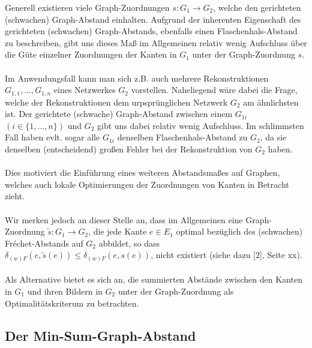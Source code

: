 \documentclass[a4paper, 12pt, twoside]{article}
\theoremstyle{Format1} %
\begin{document}
Generell existieren viele Graph-Zuordnungen $s: G_1 \to G_2$, welche den gerichteten (schwachen) Graph-Abstand einhalten.
Aufgrund der inherenten Eigenschaft des gerichteten (schwachen) Graph-Abstands, ebenfalls einen Flaschenhals-Abstand zu beschreiben, gibt uns dieses Maß im
Allgemeinen relativ wenig Aufschluss über die Güte einzelner Zuordnungen der Kanten in $G_1$ unter der Graph-Zuordnung $s$.
\\
\\
Im Anwendungsfall kann man sich z.B. auch mehrere Rekonstruktionen $G_{1,1}, ..., G_{1,n}$ eines Netzwerkes $G_2$ vorstellen.
Naheliegend wäre dabei die Frage, welche der Rekonstruktionen dem urpsprünglichen Netzwerk $G_2$ am ähnlichsten ist.
Der gerichtete (schwache) Graph-Abstand zwischen einem $G_{1i}$ $(i \in \{1,...,n\})$ und $G_2$ gibt uns dabei relativ wenig Aufschluss.
Im schlimmsten Fall haben evlt. sogar alle $G_{1i}$ denselben Flaschenhals-Abstand zu $G_2$, da sie denselben (entscheidend) großen Fehler bei der Rekonstruktion von $G_2$ haben.
\\
\\
Dies motiviert die Einführung eines weiteren Abstandsmaßes auf Graphen, welches auch lokale Optimierungen der Zuordnungen von Kanten in Betracht zieht.
\\
\\
Wir merken jedoch an dieser Stelle an, dass im Allgemeinen eine Graph-Zuordnung $\tilde{s}: G_1 \to G_2$, die jede Kante $e \in E_1$ optimal bezüglich des (schwachen)
Fréchet-Abstands auf $G_2$ abbildet, so dass $\delta_{(w)F}(e, \tilde{s}(e)) \leq \delta_{(w)F}(e, s(e))$, nicht existiert (siehe dazu [2], Seite xx).
\\
\\
Als Alternative bietet es sich an, die summierten Abstände zwischen den Kanten in $G_1$ und ihren Bildern in $G_2$ unter der Graph-Zuordnung als Optimalitätskriterum zu betrachten.

\subsection{Der Min-Sum-Graph-Abstand}
\end{document}
